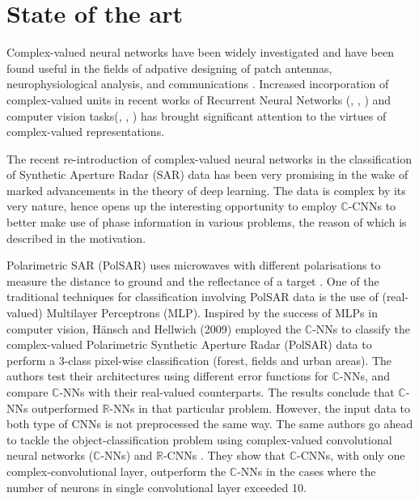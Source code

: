 \chapter{State of the art}\label{chap:comp}

Complex-valued neural networks have been widely investigated and have been found useful in the fields of adpative designing of patch antennas, neurophysiological analysis, and communications \cite{hirose2012complex}. Increased incorporation of complex-valued units in recent works of Recurrent Neural Networks (\cite{ArjovskySB15}, \cite{wisdom2016full}, \cite{danihelka2016associative}) and computer vision tasks(\cite{oyallon2015deep}, \cite{bruna2015theoretical}, \cite{worrall2017harmonic}) has brought significant attention to the virtues of complex-valued representations. 


The recent re-introduction of complex-valued neural networks in the classification of Synthetic Aperture Radar (SAR) data has been very promising in the wake of marked advancements in the theory of deep learning. The data is complex by its very nature, hence opens up the interesting opportunity to employ $\mathbb{C}$-CNNs to better make use of phase information in various problems, the reason of which is described in the motivation.

Polarimetric SAR (PolSAR) uses microwaves with different polarisations to measure the distance to ground and the reflectance of a target \cite{hansch2009classification}. One of the traditional techniques for classification involving PolSAR data is the use of (real-valued) Multilayer Perceptrons (MLP). Inspired by the success of MLPs in computer vision, H\"{a}nsch and Hellwich (2009) \cite{hansch2009classification} employed the $\mathbb{C}$-NNs to classify the complex-valued Polarimetric Synthetic Aperture Radar (PolSAR) data to perform a 3-class pixel-wise classification (forest, fields and urban areas). The authors test their architectures using different error functions for $\mathbb{C}$-NNs, and compare $\mathbb{C}$-NNs with their real-valued counterparts. The results conclude that $\mathbb{C}$-NNs outperformed $\mathbb{R}$-NNs in that particular problem. However, the input data to both type of CNNs is not preprocessed the same way. The same authors go ahead to tackle the object-classification problem using complex-valued convolutional neural networks ($\mathbb{C}$-NNs) and $\mathbb{R}$-CNNs \cite{hansch2010complex}. They show that $\mathbb{C}$-CNNs, with only one complex-convolutional layer, outperform the $\mathbb{C}$-NNs in the cases where the number of neurons in single convolutional layer exceeded 10. 

